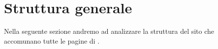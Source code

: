 \section{Struttura generale}
Nella seguente sezione andremo ad analizzare la struttura del sito che accomunano tutte le pagine di \nomeSito. 




%
